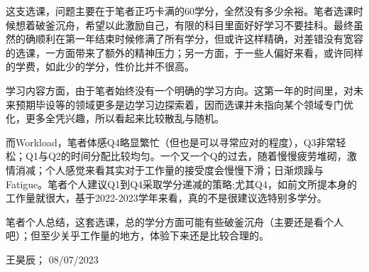 这支选课，问题主要在于笔者正巧卡满的60学分，全然没有多少余裕。笔者选课时候想着破釜沉舟，希望以此激励自己，有限的科目里面好好学习不要挂科。最终虽然的确顺利在第一年结束时候修满了所有学分，但或许这样精确，对差错没有宽容的选课，一方面带来了额外的精神压力；另一方面，于一些人偏好来看，或许同样的学费，如此少的学分，性价比并不很高。

学习内容方面，由于笔者始终没有一个明确的学习方向。这第一年的时间里，对未来预期毕设等的领域更多是边学习边探索着，因而选课并未指向某个领域专门优化，更多全凭兴趣，所以看起来比较散乱与随机。

而Workload，笔者体感Q4略显繁忙（但也是可以寻常应对的程度），Q3非常轻松；Q1与Q2的时间分配比较均匀。一个又一个Q的过去，随着慢慢疲劳堆砌，激情消减；个人感觉来看其实对于工作量的接受度会慢慢下滑；日渐烦躁与Fatigue。笔者个人建议Q1到Q4采取学分递减的策略;尤其Q4，如前文所提本身的工作量就很大，基于2022-2023学年来看，真的不是很建议选特别多学分。

笔者个人总结，这套选课，总的学分方面可能有些破釜沉舟（主要还是看个人吧）；但至少关乎工作量的地方，体验下来还是比较合理的。
\begin{flushright}
王昊辰； 08/07/2023
\end{flushright}




